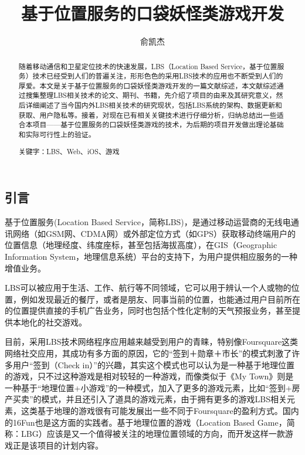\documentclass{article}
\title{基于位置服务的口袋妖怪类游戏开发}
\author{俞凯杰}
\begin{document}
\begin{CJK}{UTF8}{gbsn}
  \maketitle

  \renewcommand{\abstractname}{摘要}
	\renewcommand{\figurename}{图}
	\renewcommand{\refname}{参考文献}

	

  \begin{abstract}
    随着移动通信和卫星定位技术的快速发展，LBS（Location Based Service，基于位置服务）技术已经受到人们的普遍关注，形形色色的采用LBS技术的应用也不断受到人们的厚爱。本文是关于基于位置服务的口袋妖怪类游戏开发的一篇文献综述，本文献综述通过搜集整理LBS相关技术的论文、期刊、书籍，先介绍了项目的由来及其研究意义，然后详细阐述了当今国内外LBS相关技术的研究现状，包括LBS系统的架构、数据更新和获取、用户隐私等。接着，对现在已有相关关键技术进行仔细分析，归纳总结出一些适合本项目——基于位置服务的口袋妖怪类游戏的技术，为后期的项目开发做出理论基础和实际可行性上的验证。

    关键字：LBS、Web、iOS、游戏
    
  \end{abstract}

  \newpage
  \section{引言}
	基于位置服务(Location Based Service，简称LBS)，是通过移动运营商的无线电通讯网络（如GSM网、CDMA网）或外部定位方式（如GPS）获取移动终端用户的位置信息（地理经度、纬度座标，甚至包括海拔高度），在GIS（Geographic Information System，地理信息系统）平台的支持下，为用户提供相应服务的一种增值业务。

	LBS可以被应用于生活、工作、航行等不同领域，它可以用于辨认一个人或物的位置，例如发现最近的餐厅，或者是朋友、同事当前的位置，也能通过用户目前所在的位置提供直接的手机广告业务，同时也包括个性化定制的天气预报业务，甚至提供本地化的社交游戏。

	目前，采用LBS技术网络程序应用越来越受到用户的青睐，特别像Foursquare这类网络社交应用，其成功有多方面的原因，它的“签到＋勋章＋市长”的模式刺激了许多用户“签到（Check in）”的兴趣，其实这个模式也可以认为是一种基于地理位置的游戏，只不过这种游戏是相对较轻的一种游戏，而像类似于《My Town》则是一种基于“地理位置+小游戏”的一种模式，加入了更多的游戏元素，比如“签到+房产买卖”的模式，并且还引入了道具的游戏元素，由于拥有更多的游戏LBS相关元素，这类基于地理的游戏很有可能发展出一些不同于Foursquare的盈利方式。国内的16Fun也是这方面的实践者。基于地理位置的游戏（Location Based Game，简称：LBG）应该是又一个值得被关注的地理位置领域的方向，而开发这样一款游戏正是该项目的计划内容。
	

\end{CJK}
\end{document}
